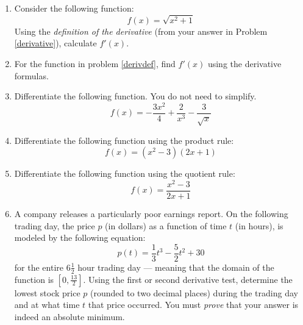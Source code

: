 \documentclass[letterpaper,12pt,fleqn]{article}
\begin{document}
\begin{enumerate}[left=0pt]
  \newpage

\item Consider the following function:
  \label{derivdef}
  \[f(x)=\sqrt{x^2+1}\]
  Using the \emph{definition of the derivative} (from your answer in Problem \ref{derivative}), calculate \(f'(x)\).

  \vspace{5in}  

\item For the function in problem \ref{derivdef}, find \(f'(x)\) using the derivative formulas.

  \newpage
  
\item Differentiate the following function.  You do not need to simplify.
  \[f(x)=-\frac{3x^2}{4}+\frac{2}{x^3}-\frac{3}{\sqrt{x}}\]

  \vspace{2in}

\item Differentiate the following function using the product rule:
  \[f(x)=(x^2-3)(2x+1)\]

  \vspace{2in}

\item Differentiate the following function using the quotient rule:
  \[f(x)=\frac{x^2-3}{2x+1}\]

  \newpage

\item A company releases a particularly poor earnings report.  On the following trading day, the price \(p\) (in
  dollars) as a function of time \(t\) (in hours), is modeled by the following equation:
  \[p(t)=\frac{1}{3}t^3-\frac{5}{2}t^2+30\]
  for the entire \(6\frac{1}{2}\) hour trading day --- meaning that the domain of the function is
  \([0,\frac{13}{2}]\).  Using the first or second derivative test, determine the lowest stock price \(p\) (rounded
  to two decimal places) during the trading day and at what time \(t\) that price occurred.  You must \emph{prove}
  that your answer is indeed an absolute minimum.
\end{enumerate}
\end{document}
